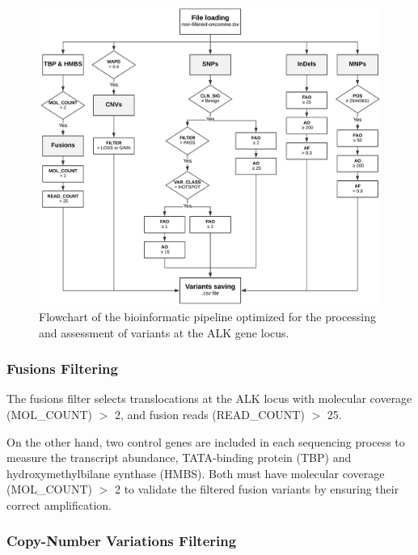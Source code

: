 \begin{figure}[ht]
    \centering
    \includegraphics[width=\textwidth]{Images/chapter_4/mut_filtering.png}
    \caption{Flowchart of the bioinformatic pipeline optimized for the processing and assessment of variants at the ALK gene locus. 
    }
    \label{fig:Algorithm}
\end{figure}

\subsubsection{Fusions Filtering}

The fusions filter selects translocations at the ALK locus with molecular coverage (MOL\_COUNT) $>$ 2, and fusion reads (READ\_COUNT) $>$ 25.

On the other hand, two control genes are included in each sequencing process to measure the transcript abundance, TATA-binding protein (TBP) and hydroxymethylbilane synthase (HMBS). Both must have molecular coverage (MOL\_COUNT) $>$ 2 to validate the filtered fusion variants by ensuring their correct amplification.

\subsubsection{Copy-Number Variations Filtering}

